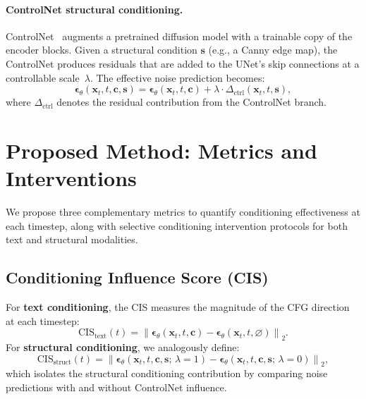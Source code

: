 \documentclass{article}
\begin{document}
\paragraph{ControlNet structural conditioning.}
ControlNet~\citep{zhang2023adding} augments a pretrained diffusion model with a trainable copy of the encoder blocks. Given a structural condition $\mathbf{s}$ (e.g., a Canny edge map), the ControlNet produces residuals that are added to the UNet's skip connections at a controllable scale~$\lambda$. The effective noise prediction becomes:
\begin{equation}
    \boldsymbol{\epsilon}_\theta(\mathbf{x}_t, t, \mathbf{c}, \mathbf{s}) = \boldsymbol{\epsilon}_\theta(\mathbf{x}_t, t, \mathbf{c}) + \lambda \cdot \Delta_{\text{ctrl}}(\mathbf{x}_t, t, \mathbf{s}),
    \label{eq:controlnet}
\end{equation}
where $\Delta_{\text{ctrl}}$ denotes the residual contribution from the ControlNet branch.

\section{Proposed Method: Metrics and Interventions}
\label{sec:method}

We propose three complementary metrics to quantify conditioning effectiveness at each timestep, along with selective conditioning intervention protocols for both text and structural modalities.

\subsection{Conditioning Influence Score (CIS)}

For \textbf{text conditioning}, the CIS measures the magnitude of the CFG direction at each timestep:
\begin{equation}
    \text{CIS}_{\text{text}}(t) = \left\| \boldsymbol{\epsilon}_\theta(\mathbf{x}_t, t, \mathbf{c}) - \boldsymbol{\epsilon}_\theta(\mathbf{x}_t, t, \varnothing) \right\|_2.
    \label{eq:cis_text}
\end{equation}
For \textbf{structural conditioning}, we analogously define:
\begin{equation}
    \text{CIS}_{\text{struct}}(t) = \left\| \boldsymbol{\epsilon}_\theta(\mathbf{x}_t, t, \mathbf{c}, \mathbf{s};\,\lambda{=}1) - \boldsymbol{\epsilon}_\theta(\mathbf{x}_t, t, \mathbf{c}, \mathbf{s};\,\lambda{=}0) \right\|_2,
    \label{eq:cis_struct}
\end{equation}
which isolates the structural conditioning contribution by comparing noise predictions with and without ControlNet influence.
\end{document}
